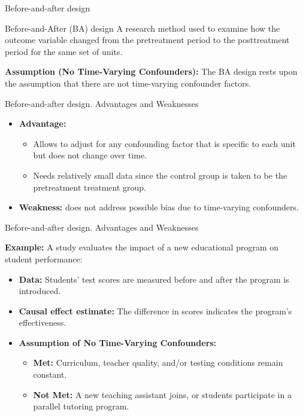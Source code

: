 \documentclass[aspectratio=169]{beamer}
\begin{document}
\begin{frame}{Before-and-after design}

    \begin{coolblock}{Before-and-After (BA) design}
        A research method used to examine how the outcome variable changed from the pretreatment period to the posttreatment period for the same set of units.
    \end{coolblock}
    \vspace{0.5cm}

    \textbf{Assumption (No Time-Varying Confounders):} The BA design rests upon the assumption that there are not time-varying confounder factors.

\end{frame}

\begin{frame}{Before-and-after design. Advantages and Weaknesses}
    
    \begin{itemize}
        \item \textbf{Advantage:} 
        \begin{itemize}
            \item[$\bullet$] Allows to adjust for any confounding factor that is specific to each unit but does not change over time.
            \item[$\bullet$] Needs relatively small data since the control group is taken to be the pretreatment treatment group.
        \end{itemize}
        \item \textbf{Weakness:} does not address possible bias due to time-varying confounders.
    \end{itemize}

\end{frame}

\begin{frame}{Before-and-after design. Advantages and Weaknesses}


    \textbf{Example:} A study evaluates the impact of a new educational program on student performance:
        \begin{itemize}
            \item \textbf{Data:} Students' test scores are measured before and after the program is introduced. 
            \item \textbf{Causal effect estimate:} The difference in scores indicates the program's effectiveness.
            \item \textbf{Assumption of No Time-Varying Confounders:}
            \begin{itemize}
                \item[$\bullet$] \textbf{Met:} Curriculum, teacher quality, and/or testing conditions remain constant.
                \item[$\bullet$] \textbf{Not Met:} A new teaching assistant joins, or students participate in a parallel tutoring program.
        \end{itemize}
    \end{itemize}
    
\end{frame}
\end{document}

